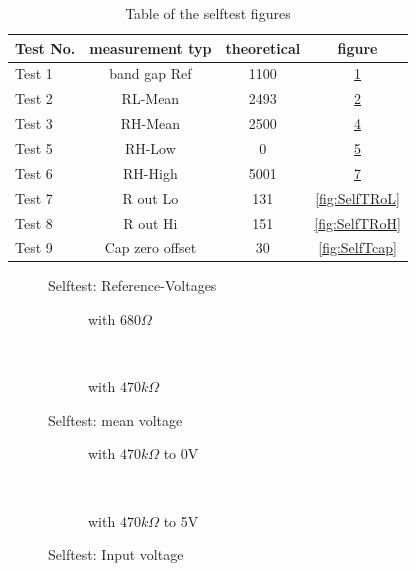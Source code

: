 \begin{table}[H]
  \begin{center}
    \begin{tabular}{| l | c | c | c |}
    \hline
Test No. & measurement typ & theoretical & figure \\
    \hline
    \hline
Test 1 & band gap Ref  & 1100 & \ref{fig:SelfTref} \\
    \hline
Test 2 & RL-Mean & 2493 & \ref{fig:SelfTMitL} \\
    \hline
Test 3 & RH-Mean & 2500 & \ref{fig:SelfTMitH} \\
    \hline
Test 5 & RH-Low &  0 & \ref{fig:SelfTlowH} \\
    \hline
Test 6 & RH-High & 5001 & \ref{fig:SelfTtopH} \\
    \hline
Test 7 & R out Lo & 131 & \ref{fig:SelfTRoL} \\
    \hline
Test 8 & R out Hi & 151 & \ref{fig:SelfTRoH} \\
    \hline
Test 9 & Cap zero offset & 30 & \ref{fig:SelfTcap} \\
    \hline
    \end{tabular}
  \end{center}
  \caption{Table of the selftest figures }
  \label{tab:test_m168} 
\end{table}

\begin{figure}[H]
\centering

\caption{Selftest: Reference-Voltages}
\label{fig:SelfTref}
\end{figure}


\begin{figure}[H]
  \begin{subfigure}[b]{9cm}
    \centering
    \resizebox{9cm}{!}{}
    \caption{with \(680 \Omega\)}
    \label{fig:SelfTMitL}
  \end{subfigure}
  ~
  \begin{subfigure}[b]{9cm}
    \centering
    \resizebox{9cm}{!}{}
    \caption{with \(470 k\Omega\)}
    \label{fig:SelfTMitH}
  \end{subfigure}
  \caption{Selftest: mean voltage}
\end{figure}

\begin{figure}[H]
  \begin{subfigure}[b]{9cm}
  \centering
    \resizebox{9cm}{!}{}
    \caption{with \(470 k\Omega\) to 0V}
    \label{fig:SelfTlowH}
  \end{subfigure}
  ~
  \begin{subfigure}[b]{9cm}
  \centering
    \resizebox{9cm}{!}{}
    \caption{with \(470 k\Omega\) to 5V}
    \label{fig:SelfTtopH}
  \end{subfigure}
  \caption{Selftest: Input voltage}
\end{figure}


